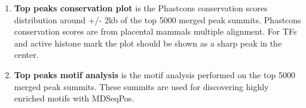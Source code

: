 \documentclass[9pt]{article}
\begin{document}
\begin{enumerate}
 \item{\textbf{Top peaks conservation plot} is the Phastcons conservation scores distribution around +/- 2kb of the top 5000 merged peak summits. Phastcons conservation scores are from placental mammals multiple alignment. For TFs and active histone mark the plot should be shown as a sharp peak in the center.}
   
 \item{\textbf{Top peaks motif analysis} is the motif analysis performed on the top 5000 merged peak summits. These summits are used for discovering highly enriched motifs with MDSeqPos.}
  
\end{enumerate}

  {}
    
\end{document}
